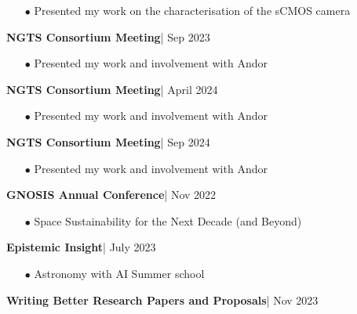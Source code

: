 \documentclass[10pt]{article}
\begin{document}
\begin{itemize}[itemsep = -0.75 mm, leftmargin=*]
    \item[{\color[RGB]{10,0,254}$\bullet$}] \noindent Presented my work on the characterisation of the sCMOS camera
\end{itemize} 
\textbf{\large NGTS Consortium Meeting}|  \hfill { \small Sep 2023}
\\[-0.5cm]

\begin{itemize}[itemsep = -0.75 mm, leftmargin=*]
    \item[{\color[RGB]{10,0,254}$\bullet$}] \noindent Presented my work and involvement with Andor
\end{itemize} 
\textbf{\large NGTS Consortium Meeting}|  \hfill { \small April 2024}
\\[-0.5cm]

\begin{itemize}[itemsep = -0.75 mm, leftmargin=*]
    \item[{\color[RGB]{10,0,254}$\bullet$}] \noindent Presented my work and involvement with Andor
\end{itemize} 
\textbf{\large NGTS Consortium Meeting}|  \hfill { \small Sep 2024}
\\[-0.5cm]

\begin{itemize}[itemsep = -0.75 mm, leftmargin=*]
    \item[{\color[RGB]{10,0,254}$\bullet$}] \noindent Presented my work and involvement with Andor
\end{itemize} 
\textbf{\large GNOSIS Annual Conference}|  \hfill { \small Nov 2022}
\\[-0.5cm]

\begin{itemize}[itemsep = -0.75 mm, leftmargin=*]
    \item[{\color[RGB]{10,0,254}$\bullet$}] \noindent Space Sustainability for the Next Decade (and Beyond)
\end{itemize} 
\textbf{\large Epistemic Insight}|  \hfill { \small July 2023}
\\[-0.5cm]

\begin{itemize}[itemsep = -0.75 mm, leftmargin=*]
    \item[{\color[RGB]{10,0,254}$\bullet$}] \noindent Astronomy with AI Summer school
\end{itemize} 
\textbf{\large Writing Better Research Papers and Proposals}|  \hfill { \small Nov 2023}
\\[-0.5cm]
\end{document}
